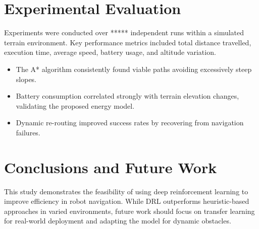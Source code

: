 \documentclass[11pt,twocolumn]{article}
\begin{document}
\section{Experimental Evaluation}

Experiments were conducted over ***** independent runs within a simulated terrain environment. Key performance metrics included total distance travelled, execution time, average speed, battery usage, and altitude variation. 

\begin{itemize}
    \item The A* algorithm consistently found viable paths avoiding excessively steep slopes.
    \item Battery consumption correlated strongly with terrain elevation changes, validating the proposed energy model.
    \item Dynamic re-routing improved success rates by recovering from navigation failures.
\end{itemize}


\section{Conclusions and Future Work}

This study demonstrates the feasibility of using deep reinforcement learning to improve efficiency in robot navigation. While DRL outperforms heuristic-based approaches in varied environments, future work should focus on transfer learning for real-world deployment and adapting the model for dynamic obstacles.



\end{document}
